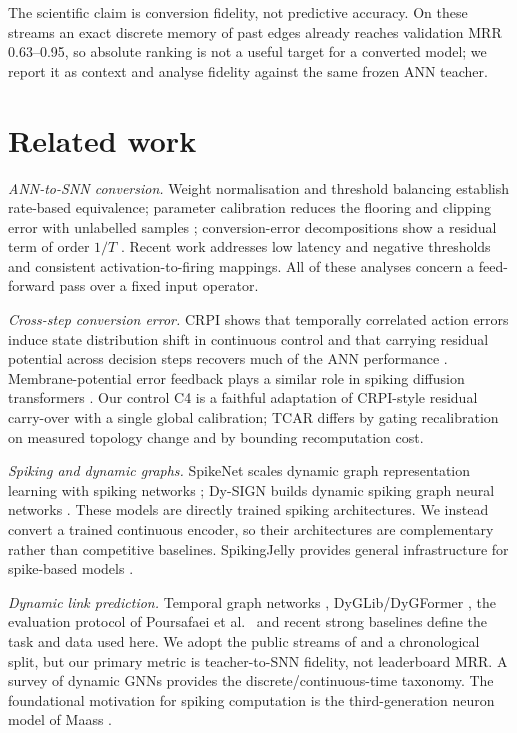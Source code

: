 \documentclass[preprint,12pt]{elsarticle}
\begin{document}
The scientific claim is conversion fidelity, not predictive accuracy. On these streams an exact discrete memory of past edges already reaches validation MRR 0.63--0.95, so absolute ranking is not a useful target for a converted model; we report it as context and analyse fidelity against the same frozen ANN teacher.

\section{Related work}
\label{sec:related}

\textit{ANN-to-SNN conversion.} Weight normalisation and threshold balancing \cite{diehl2015,rueckauer2017} establish rate-based equivalence; parameter calibration reduces the flooring and clipping error with unlabelled samples \cite{li2022snncap}; conversion-error decompositions show a residual term of order $1/T$ \cite{habara2024}. Recent work addresses low latency and negative thresholds \cite{xia2026neuro} and consistent activation-to-firing mappings. All of these analyses concern a feed-forward pass over a fixed input operator.

\textit{Cross-step conversion error.} CRPI shows that temporally correlated action errors induce state distribution shift in continuous control and that carrying residual potential across decision steps recovers much of the ANN performance \cite{xu2026crpi}. Membrane-potential error feedback plays a similar role in spiking diffusion transformers \cite{fang2026mpef}. Our control C4 is a faithful adaptation of CRPI-style residual carry-over with a single global calibration; TCAR differs by gating recalibration on measured topology change and by bounding recomputation cost.

\textit{Spiking and dynamic graphs.} SpikeNet scales dynamic graph representation learning with spiking networks \cite{li2023spikenet}; Dy-SIGN builds dynamic spiking graph neural networks \cite{yin2024dysign}. These models are directly trained spiking architectures. We instead convert a trained continuous encoder, so their architectures are complementary rather than competitive baselines. SpikingJelly provides general infrastructure for spike-based models \cite{fang2023spikingjelly}.

\textit{Dynamic link prediction.} Temporal graph networks \cite{rossi2020tgn}, DyGLib/DyGFormer \cite{yu2023dyglib}, the evaluation protocol of Poursafaei et al.\ \cite{poursafaei2022} and recent strong baselines \cite{gao2025hyperevent} define the task and data used here. We adopt the public streams of \cite{poursafaei2022dataset} and a chronological split, but our primary metric is teacher-to-SNN fidelity, not leaderboard MRR. A survey of dynamic GNNs \cite{zheng2025survey} provides the discrete/continuous-time taxonomy. The foundational motivation for spiking computation is the third-generation neuron model of Maass \cite{maass1997}.
\end{document}
